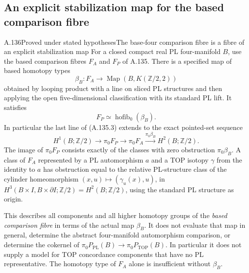 \subsection{An explicit stabilization map for the based comparison fibre}

\begin{saresult}{A.136}{Proved under stated hypotheses}{The base-four comparison fibre is a fibre of an explicit stabilization map}
For a closed compact real PL four-manifold $B$, use the based comparison
fibres $F_A$ and $F_P$ of A.135. There is a specified map of based
homotopy types
\[
 \beta_B:F_A\longrightarrow\operatorname{Map}(B,K(\mathbb Z/2,2))
                                                        \tag{A.136.1}
\]
obtained by looping product with a line on sliced PL structures and
then applying the open five-dimensional classification with its
standard PL lift. It satisfies
\[
 F_P\simeq\operatorname{hofib}_0(\beta_B).                \tag{A.136.2}
\]
In particular the last line of (A.135.3) extends to the exact
pointed-set sequence
\[
 H^1(B;\mathbb Z/2)\longrightarrow\pi_0F_P
 \longrightarrow\pi_0F_A
 \xrightarrow{\pi_0\beta_B}H^2(B;\mathbb Z/2).           \tag{A.136.3}
\]
The image of $\pi_0F_P$ consists exactly of the classes with zero
obstruction $\pi_0\beta_B$.
A class of $F_A$ represented by a PL automorphism $a$ and a TOP isotopy
$\gamma$ from the identity to $a$ has obstruction equal to the relative
PL-structure class of the cylinder homeomorphism
$(x,u)\mapsto(\gamma_u(x),u)$, in
$H^3(B\times I,B\times\partial I;\mathbb Z/2)
=H^2(B;\mathbb Z/2)$, using the standard PL structure as origin.

This describes all components and all higher homotopy groups of the
\emph{based comparison fibre} in terms of the actual map $\beta_B$.
It does not evaluate that map in general, determine the abstract
four-manifold automorphism comparison, or determine the cokernel of
$\pi_0P_{\mathrm{PL}}(B)\to\pi_0P_{\mathrm{TOP}}(B)$.
In particular it does not supply a model for TOP concordance components
that have no PL representative. The homotopy type of $F_A$ alone is
insufficient without $\beta_B$.
\end{saresult}
